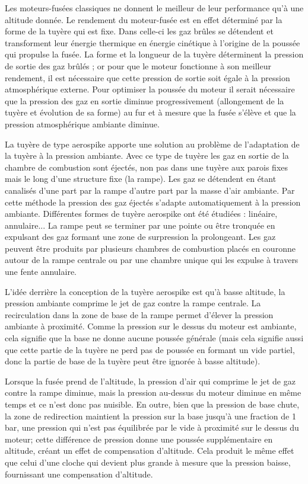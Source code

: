 \documentclass{report}
\begin{document}
Les moteurs-fusées classiques ne donnent le meilleur de leur performance qu'à une altitude donnée. Le rendement du moteur-fusée est en effet déterminé par la forme de la tuyère qui est fixe. Dans celle-ci les gaz brûles se détendent et transforment leur énergie thermique en énergie cinétique à l'origine de la poussée qui propulse la fusée. La forme et la longueur de la tuyère déterminent la pression de sortie des gaz brûlés ; or pour que le moteur fonctionne à son meilleur rendement, il est nécessaire que cette pression de sortie soit égale à la pression atmosphérique externe. Pour optimiser la poussée du moteur il serait nécessaire que la pression des gaz en sortie diminue progressivement (allongement de la tuyère et évolution de sa forme) au fur et à mesure que la fusée s'élève et que la pression atmosphérique ambiante diminue.

La tuyère de type aerospike apporte une solution au problème de l'adaptation de la tuyère à la pression ambiante. Avec ce type de tuyère les gaz en sortie de la chambre de combustion sont éjectés, non pas dans une tuyère aux parois fixes mais le long d'une structure fixe (la rampe). Les gaz se détendent en étant canalisés d'une part par la rampe d'autre part par la masse d'air ambiante. Par cette méthode la pression des gaz éjectés s'adapte automatiquement à la pression ambiante. Différentes formes de tuyère aerospike ont été étudiées : linéaire, annulaire... La rampe peut se terminer par une pointe ou être tronquée en expulsant des gaz formant une zone de surpression la prolongeant. Les gaz peuvent être produits par plusieurs chambres de combustion placés en couronne autour de la rampe centrale ou par une chambre unique qui les expulse à travers une fente annulaire.

L'idée derrière la conception de la tuyère aerospike est qu'à basse altitude, la pression ambiante comprime le jet de gaz contre la rampe centrale. La recirculation dans la zone de base de la rampe permet d'élever la pression ambiante à proximité. Comme la pression sur le dessus du moteur est ambiante, cela signifie que la base ne donne aucune poussée générale (mais cela signifie aussi que cette partie de la tuyère ne perd pas de poussée en formant un vide partiel, donc la partie de base de la tuyère peut être ignorée à basse altitude).

Lorsque la fusée prend de l'altitude, la pression d'air qui comprime le jet de gaz contre la rampe diminue, mais la pression au-dessus du moteur diminue en même temps et ce n'est donc pas nuisible. En outre, bien que la pression de base chute, la zone de redirection maintient la pression sur la base jusqu'à une fraction de 1 bar, une pression qui n'est pas équilibrée par le vide à proximité sur le dessus du moteur; cette différence de pression donne une poussée supplémentaire en altitude, créant un effet de compensation d'altitude. Cela produit le même effet que celui d'une cloche qui devient plus grande à mesure que la pression baisse, fournissant une compensation d'altitude.
\end{document}
